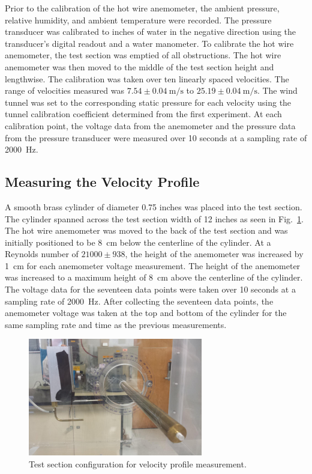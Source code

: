 \documentclass[journal,letterpaper]{IEEEtran}
\begin{document}
Prior to the calibration of the hot wire anemometer, the ambient pressure, relative humidity, and ambient temperature were recorded.
The pressure transducer was calibrated to inches of water in the negative direction using the transducer's digital readout and a water manometer.
To calibrate the hot wire anemometer, the test section was emptied of all obstructions.
The hot wire anemometer was then moved to the middle of the test section height and lengthwise.
The calibration was taken over ten linearly spaced velocities.
The range of velocities measured was $7.54 \pm \qty{0.04}{\m\per\s}$ to $25.19 \pm \qty{0.04}{\m\per\s}$.
The wind tunnel was set to the corresponding static pressure for each velocity using the tunnel calibration coefficient determined from the first experiment.
At each calibration point, the voltage data from the anemometer and the pressure data from the pressure transducer were measured over 10 seconds at a sampling rate of \qty{2000}{\hertz}.

\subsection{Measuring the Velocity Profile}

A smooth brass cylinder of diameter 0.75 inches was placed into the test section.
The cylinder spanned across the test section width of 12 inches as seen in Fig.~\ref{fig:cylinder}.
The hot wire anemometer was moved to the back of the test section and was initially positioned to be \qty{8}{\cm} below the centerline of the cylinder.
At a Reynolds number of $21000 \pm 938$, the height of the anemometer was increased by \qty{1}{\cm} for each anemometer voltage measurement.
The height of the anemometer was increased to a maximum height of \qty{8}{\cm} above the centerline of the cylinder.
The voltage data for the seventeen data points were taken over 10 seconds at a sampling rate of \qty{2000}{\hertz}.
After collecting the seventeen data points, the anemometer voltage was taken at the top and bottom of the cylinder for the same sampling rate and time as the previous measurements.

\begin{figure}[H]
    \centering
    \includegraphics[width=3in]{Cylinder}
    \caption{Test section configuration for velocity profile measurement.}
    \label{fig:cylinder}
\end{figure}
\end{document}
